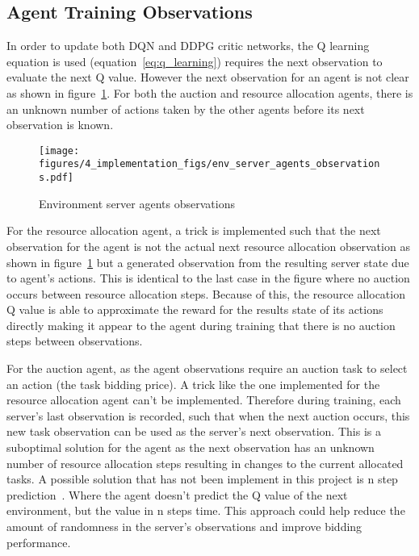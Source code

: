 \subsection{Agent Training Observations}\label{subsec:agent-training-observations}
In order to update both DQN and DDPG critic networks, the Q learning equation is used (equation~\eqref{eq:q_learning})
requires the next observation to evaluate the next Q value. However the next observation for an
agent is not clear as shown in figure~\ref{fig:environment-observations}. For both the auction and resource allocation
agents, there is an unknown number of actions taken by the other agents before its next observation is known.

\begin{figure}[h]
    \centering
    \texttt{[image: figures/4\_implementation\_figs/env\_server\_agents\_observations.pdf]}
    \caption{Environment server agents observations}
    \label{fig:environment-observations}
\end{figure}

For the resource allocation agent, a trick is implemented such that the next observation for the agent is not the
actual next resource allocation observation as shown in figure~\ref{fig:environment-observations} but a generated
observation from the resulting server state due to agent's actions. This is identical to the last case in the figure
where no auction occurs between resource allocation steps. Because of this, the resource allocation Q value is able to
approximate the reward for the results state of its actions directly making it appear to the agent during training that
there is no auction steps between observations.

For the auction agent, as the agent observations require an auction task to select an action (the task bidding price).
A trick like the one implemented for the resource allocation agent can't be implemented. Therefore during training,
each server's last observation is recorded, such that when the next auction occurs, this new task observation can be
used as the server's next observation. This is a suboptimal solution for the agent as the next observation
has an unknown number of resource allocation steps resulting in changes to the current allocated tasks.
A possible solution that has not been implement in this project is n step prediction~\citep{multi-step-dqn}. Where the
agent doesn't predict the Q value of the next environment, but the value in n steps time. This approach could help
reduce the amount of randomness in the server's observations and improve bidding performance.


